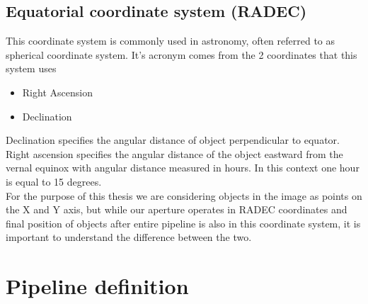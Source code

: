\documentclass[12pt, a4paper, oneside]{book}
\begin{document}
\subsection{Equatorial coordinate system (RADEC)}
This coordinate system is commonly used in astronomy, often referred to as spherical coordinate system.
It's acronym comes from the 2 coordinates that this system uses
\begin{itemize}
    \item{Right Ascension}
    \item{Declination}
\end{itemize}
Declination specifies the angular distance of object perpendicular to equator.\\
Right ascension specifies the angular distance of the object eastward from the vernal equinox with angular distance measured in hours.
In this context one hour is equal to 15 degrees.\\
For the purpose of this thesis we are considering objects in the image as points on the X and Y axis, but while our aperture operates in RADEC coordinates and final position of objects after entire pipeline is also in this coordinate system, it is important to understand the difference between the two.
\section{Pipeline definition}
\end{document}
